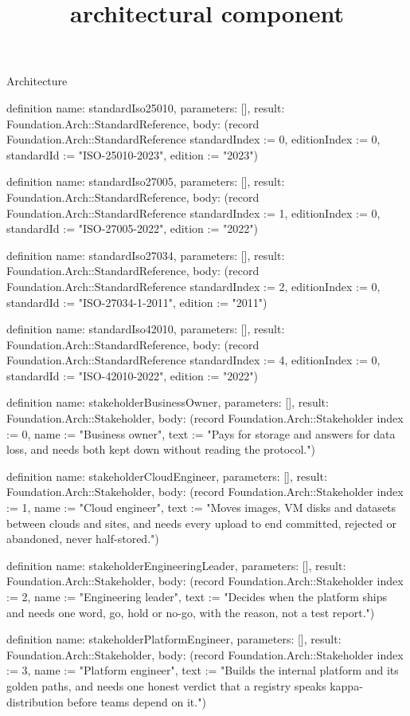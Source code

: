 \begin{lexlean}{Architecture}
\title{architectural component}
\begin{semanticmodule}
definition{
  name: standardIso25010,
  parameters: [],
  result: Foundation.Arch::StandardReference,
  body: (record Foundation.Arch::StandardReference {standardIndex := 0, editionIndex := 0, standardId := "ISO-25010-2023", edition := "2023"})
}

definition{
  name: standardIso27005,
  parameters: [],
  result: Foundation.Arch::StandardReference,
  body: (record Foundation.Arch::StandardReference {standardIndex := 1, editionIndex := 0, standardId := "ISO-27005-2022", edition := "2022"})
}

definition{
  name: standardIso27034,
  parameters: [],
  result: Foundation.Arch::StandardReference,
  body: (record Foundation.Arch::StandardReference {standardIndex := 2, editionIndex := 0, standardId := "ISO-27034-1-2011", edition := "2011"})
}

definition{
  name: standardIso42010,
  parameters: [],
  result: Foundation.Arch::StandardReference,
  body: (record Foundation.Arch::StandardReference {standardIndex := 4, editionIndex := 0, standardId := "ISO-42010-2022", edition := "2022"})
}

definition{
  name: stakeholderBusinessOwner,
  parameters: [],
  result: Foundation.Arch::Stakeholder,
  body: (record Foundation.Arch::Stakeholder {index := 0, name := "Business owner", text := "Pays for storage and answers for data loss, and needs both kept down without reading the protocol."})
}

definition{
  name: stakeholderCloudEngineer,
  parameters: [],
  result: Foundation.Arch::Stakeholder,
  body: (record Foundation.Arch::Stakeholder {index := 1, name := "Cloud engineer", text := "Moves images, VM disks and datasets between clouds and sites, and needs every upload to end committed, rejected or abandoned, never half-stored."})
}

definition{
  name: stakeholderEngineeringLeader,
  parameters: [],
  result: Foundation.Arch::Stakeholder,
  body: (record Foundation.Arch::Stakeholder {index := 2, name := "Engineering leader", text := "Decides when the platform ships and needs one word, go, hold or no-go, with the reason, not a test report."})
}

definition{
  name: stakeholderPlatformEngineer,
  parameters: [],
  result: Foundation.Arch::Stakeholder,
  body: (record Foundation.Arch::Stakeholder {index := 3, name := "Platform engineer", text := "Builds the internal platform and its golden paths, and needs one honest verdict that a registry speaks kappa-distribution before teams depend on it."})
}


\end{semanticmodule}
\end{lexlean}
